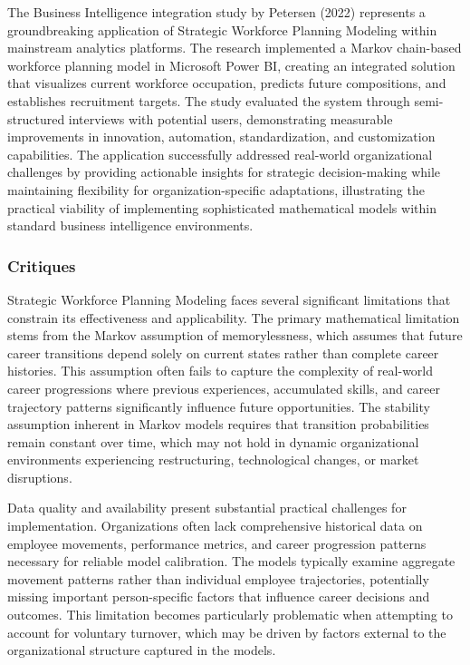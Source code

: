\documentclass[main.tex]{subfiles}
\begin{document}
The Business Intelligence integration study by Petersen (2022) represents a groundbreaking application of Strategic Workforce Planning Modeling within mainstream analytics platforms\parencite{coursehero2024}. The research implemented a Markov chain-based workforce planning model in Microsoft Power BI, creating an integrated solution that visualizes current workforce occupation, predicts future compositions, and establishes recruitment targets. The study evaluated the system through semi-structured interviews with potential users, demonstrating measurable improvements in innovation, automation, standardization, and customization capabilities. The application successfully addressed real-world organizational challenges by providing actionable insights for strategic decision-making while maintaining flexibility for organization-specific adaptations, illustrating the practical viability of implementing sophisticated mathematical models within standard business intelligence environments.

\subsubsection{Critiques}

Strategic Workforce Planning Modeling faces several significant limitations that constrain its effectiveness and applicability. The primary mathematical limitation stems from the Markov assumption of memorylessness, which assumes that future career transitions depend solely on current states rather than complete career histories\parencite{runn2024,markovml2024}. This assumption often fails to capture the complexity of real-world career progressions where previous experiences, accumulated skills, and career trajectory patterns significantly influence future opportunities. The stability assumption inherent in Markov models requires that transition probabilities remain constant over time, which may not hold in dynamic organizational environments experiencing restructuring, technological changes, or market disruptions\parencite{runn2024,thinkdev2023}.

Data quality and availability present substantial practical challenges for implementation. Organizations often lack comprehensive historical data on employee movements, performance metrics, and career progression patterns necessary for reliable model calibration\parencite{thinkdev2023}. The models typically examine aggregate movement patterns rather than individual employee trajectories, potentially missing important person-specific factors that influence career decisions and outcomes\parencite{runn2024}. This limitation becomes particularly problematic when attempting to account for voluntary turnover, which may be driven by factors external to the organizational structure captured in the models.
\end{document}
